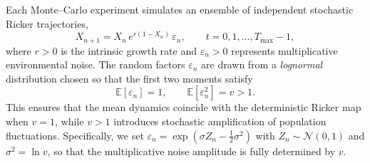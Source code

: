 \documentclass[12pt]{article}
\theoremstyle{definition}
\begin{document}
Each Monte--Carlo experiment simulates an ensemble of independent stochastic Ricker trajectories,
\[
X_{n+1} = X_n\, e^{r(1 - X_n)}\,\varepsilon_n, \qquad t=0,1,\dots,T_{\max}-1,
\]
where \(r>0\) is the intrinsic growth rate and \(\varepsilon_n>0\) represents
multiplicative environmental noise.
The random factors \(\varepsilon_n\) are drawn from a \emph{lognormal} distribution
chosen so that the first two moments satisfy
\[
\mathbb{E}[\varepsilon_n]=1, \qquad \mathbb{E}[\varepsilon_n^2]=v>1.
\]
This ensures that the mean dynamics coincide with the deterministic Ricker map
when \(v=1\), while \(v>1\) introduces stochastic amplification of population fluctuations.
Specifically, we set
\(\varepsilon_n = \exp(\sigma Z_n - \tfrac{1}{2}\sigma^2)\)
with \(Z_n\sim \mathcal{N}(0,1)\) and \(\sigma^2 = \ln v\),
so that the multiplicative noise amplitude is fully determined by \(v\).
\end{document}
